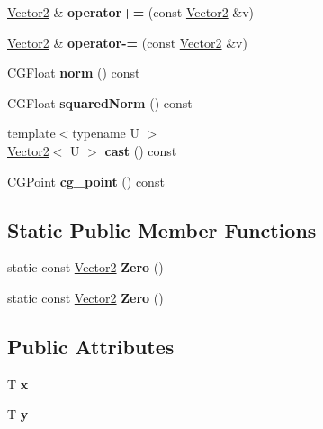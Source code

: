 \begin{DoxyCompactItemize}
\mbox{\hyperlink{struct_p_o_p_1_1_vector2}{Vector2}} \& {\bfseries operator+=} (const \mbox{\hyperlink{struct_p_o_p_1_1_vector2}{Vector2}} \&v)
\item 
\mbox{\label{struct_p_o_p_1_1_vector2_a64acd43afec974d5abde48a6b2ceb2ae}} 
\mbox{\hyperlink{struct_p_o_p_1_1_vector2}{Vector2}} \& {\bfseries operator-\/=} (const \mbox{\hyperlink{struct_p_o_p_1_1_vector2}{Vector2}} \&v)
\item 
\mbox{\label{struct_p_o_p_1_1_vector2_a963b4001ed0f662e08626890db8abdfb}} 
C\+G\+Float {\bfseries norm} () const
\item 
\mbox{\label{struct_p_o_p_1_1_vector2_a777ce5f8a7852aa8209c754d34af461a}} 
C\+G\+Float {\bfseries squared\+Norm} () const
\item 
\mbox{\label{struct_p_o_p_1_1_vector2_a1ba08504d1b396ef2e7940db4c8a7e11}} 
{\footnotesize template$<$typename U $>$ }\\\mbox{\hyperlink{struct_p_o_p_1_1_vector2}{Vector2}}$<$ U $>$ {\bfseries cast} () const
\item 
\mbox{\label{struct_p_o_p_1_1_vector2_a64c276e2078216da1bef5bfdab1a85ba}} 
C\+G\+Point {\bfseries cg\+\_\+point} () const
\end{DoxyCompactItemize}
\subsection*{Static Public Member Functions}
\begin{DoxyCompactItemize}
\item 
\mbox{\label{struct_p_o_p_1_1_vector2_a4f08950f37f23de1e3e2bd539929eac4}} 
static const \mbox{\hyperlink{struct_p_o_p_1_1_vector2}{Vector2}} {\bfseries Zero} ()
\item 
\mbox{\label{struct_p_o_p_1_1_vector2_a4f08950f37f23de1e3e2bd539929eac4}} 
static const \mbox{\hyperlink{struct_p_o_p_1_1_vector2}{Vector2}} {\bfseries Zero} ()
\end{DoxyCompactItemize}
\subsection*{Public Attributes}
\begin{DoxyCompactItemize}
\item 
\mbox{\label{struct_p_o_p_1_1_vector2_aa27c08ab25792a9b68947424a58d5ac3}} 
T {\bfseries x}
\item 
\mbox{\label{struct_p_o_p_1_1_vector2_a7d92af8c7a236367694a2988db6ca286}} 
T {\bfseries y}
\end{DoxyCompactItemize}


